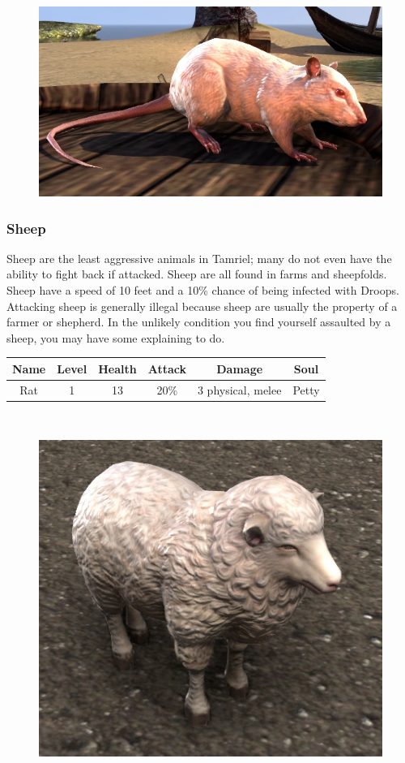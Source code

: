 \documentclass[12pt]{book}
\begin{document}
\begin{figure}[h]
	\centering
	\includegraphics[scale=0.5]{rat.png}
\end{figure}

\subsubsection{Sheep}
Sheep are the least aggressive animals in Tamriel; many do not even have the ability to fight back if attacked. Sheep are all found in farms and sheepfolds. Sheep have a speed of 10 feet and a 10\% chance of being infected with Droops. Attacking sheep is generally illegal because sheep are usually the property of a farmer or shepherd. In the unlikely condition you find yourself assaulted by a sheep, you may have some explaining to do.

\begin{tabular}{|c|c|c|c|c|c|}
\hline
Name & Level & Health & Attack & Damage & Soul\\ \hline
Rat & 1 & 13 & 20\% & 3 physical, melee & Petty\\ \hline
\end{tabular}\\

\begin{figure}[h]
	\centering
	\includegraphics[scale=0.5]{sheep.png}
\end{figure}
\end{document}
